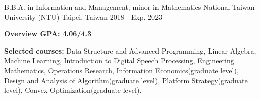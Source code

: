 

\begin{cventries}

  \cventry
    {B.B.A. in Information and Management, minor in Mathematics} %
    {National Taiwan University (NTU)} %
    {Taipei, Taiwan} %
    {2018 - Exp. 2023} %
    {
      \begin{cvitems} %
        \item {\textbf{Overview GPA: 4.06/4.3}}
        \item {\textbf{Selected courses:} Data Structure and Advanced Programming, Linear Algebra, Machine Learning, Introduction to Digital Speech Processing, Engineering Mathematics, Operations Research, Information Economics(graduate level), Design and Analysis of Algorithm(graduate level), Platform Strategy(graduate level), Convex Optimization(graduate level).}
      \end{cvitems}
    }

\end{cventries}
